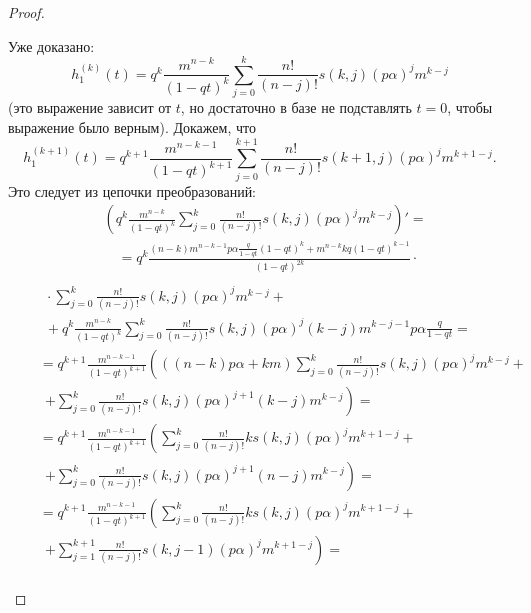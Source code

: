 \documentclass[12pt, specialist, subf, substylefile = spbu_report.rtx]{disser}
\begin{document}
\begin{proof}
\begin{enumerate}
			Уже доказано:
			\[
				h _1 ^{(k)} (t) = q ^k \frac {m ^{n - k}} {(1 - qt) ^k} \sum \limits ^k _{j = 0} \frac {n !} {(n - j)!} s(k, j) (p \alpha) ^j m ^{k - j}
			\]
			(это выражение зависит от $t$, но достаточно в базе не подставлять $t = 0$, чтобы выражение было верным). Докажем, что
			\[
				h _1 ^{(k + 1)} (t) = q ^{k + 1} \frac {m ^{n - k - 1}} {(1 - qt) ^{k + 1}} \sum \limits ^{k + 1} _{j = 0} \frac {n !} {(n - j)!} s(k + 1, j) (p \alpha) ^j m ^{k + 1 - j}.
			\]
			Это следует из цепочки преобразований:
			\[
				\begin{aligned}
					&\left(q ^k \frac {m ^{n - k}} {(1 - qt) ^k} \sum \limits ^k _{j = 0} \frac {n !} {(n - j)!} s(k, j) (p \alpha) ^j m ^{k - j}\right)' =\\
					&\quad= q ^k \frac	{(n - k)m ^{n - k - 1} p \alpha \frac{q}{1 - qt} (1 - qt) ^k + m ^{n - k} kq (1 - qt) ^{k - 1}} {(1 - qt) ^{2k}} \cdot\\
				\end{aligned}
			\]
			\[
				\begin{aligned}
					&\quad~~\cdot \sum \limits ^k _{j = 0} \frac {n !} {(n - j)!} s(k, j) (p \alpha) ^j m ^{k - j} +\\
					&\quad~~ + q ^k \frac {m ^{n - k}} {(1 - qt) ^k} \sum \limits ^k _{j = 0} \frac {n !} {(n - j)!} s(k, j) (p \alpha) ^j (k - j)m ^{k - j - 1} p \alpha \frac{q}{1 - qt} =\\
					&\quad= q ^{k + 1} \frac {m ^{n - k - 1}} {(1 - qt) ^{k + 1}} \left(\left((n - k) p \alpha + km\right) \sum \limits ^k _{j = 0} \frac {n !} {(n - j)!} s(k, j) (p \alpha) ^j m ^{k - j} +\right.\\
					&\quad~~ \left.+ \sum \limits ^k _{j = 0} \frac {n !} {(n - j)!} s(k, j) (p \alpha) ^{j + 1} (k - j)m ^{k - j} \right)=\\
					&\quad= q ^{k + 1} \frac {m ^{n - k - 1}} {(1 - qt) ^{k + 1}} \left(\sum \limits ^k _{j = 0} \frac {n !} {(n - j)!} k s(k, j) (p \alpha) ^j m ^{k + 1 - j} +\right.\\
					&\quad~~\left.+ \sum \limits ^k _{j = 0} \frac {n !} {(n - j)!} s(k, j) (p \alpha) ^{j + 1} (n - j)m ^{k - j} \right)=\\
					&\quad= q ^{k + 1} \frac {m ^{n - k - 1}} {(1 - qt) ^{k + 1}} \left(\sum \limits ^k _{j = 0} \frac {n !} {(n - j)!} k s(k, j) (p \alpha) ^j m ^{k + 1 - j} +\right.\\
					&\quad~~ \left.+ \sum \limits ^{k + 1} _{j = 1} \frac {n !} {(n - j)!} s(k, j - 1) (p \alpha) ^j m ^{k + 1 - j} \right)=\\

\end{aligned}\]
\end{enumerate}
\end{proof}
\end{document}
